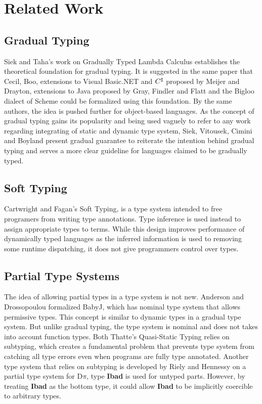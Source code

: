 \section{Related Work}

\subsection{Gradual Typing}
Siek and Taha's work on Gradually Typed Lambda Calculus\cite{siek2006gradual}
establishes the theoretical foundation for gradual typing.
It is suggested in the same paper that Cecil\cite{chambers2004cecil}, Boo\cite{de2005boo},
extensions to Visual Basic.NET and $C^\sharp$ proposed by Meijer and Drayton\cite{meijer2004static},
extensions to Java proposed by Gray, Findler and Flatt\cite{gray2005fine}
and the Bigloo \cite{bres2004compiling,serrano2002bigloo} dialect of Scheme\cite{abelson1998revised}
could be formalized using this foundation.
By the same authors,
the idea is pushed further for object-based languages\cite{siek2007gradual}.
As the concept of gradual typing gains its popularity and being used vaguely to
refer to any work regarding integrating of static and dynamic type system,
Siek, Vitousek, Cimini and Boyland present gradual guarantee\cite{siek2015refined}
to reiterate the intention behind gradual typing and serves a more clear guideline for
languages claimed to be gradually typed.

\subsection{Soft Typing}
Cartwright and Fagan's Soft Typing\cite{cartwright1991soft},
is a type system intended to free programers from writing type annotations.
Type inference is used instead to assign appropriate types to terms.
While this design improves performance of dynamically typed languages
as the inferred information is used to removing some runtime dispatching,
it does not give programmers control over types.

\subsection{Partial Type Systems}
The idea of allowing partial types in a type system is not new.
Anderson and Drossopoulou formalized BabyJ\cite{anderson2003babyj}, which has
nominal type system that allows permissive types.
This concept is similar to dynamic types in a gradual type system.
But unlike gradual typing, the type system is nominal and does not takes into account function types.
Both Thatte's Quasi-Static Typing\cite{thatte1989quasi} relies on subtyping,
which creates a fundamental problem that prevents type system from catching all type errors even when programs are
fully type annotated.
Another type system that relies on subtyping
is developed by Riely and Hennessy\cite{riely1999trust} on a partial type system for D$\pi$,
type \textbf{Ibad} is used for untyped parts. However, by treating \textbf{Ibad} as the bottom type,
it could allow \textbf{Ibad} to be implicitly coercible to arbitrary types.

